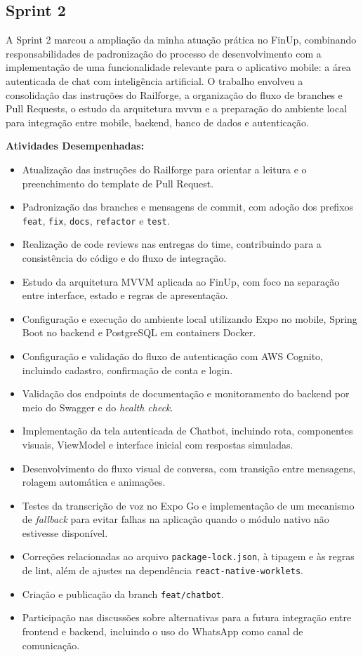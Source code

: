 \subsection{Sprint 2}

A Sprint 2 marcou a ampliação da minha atuação prática no FinUp, combinando
responsabilidades de padronização do processo de desenvolvimento com a
implementação de uma funcionalidade relevante para o aplicativo mobile: a área
autenticada de chat com inteligência artificial. O trabalho envolveu a
consolidação das instruções do Railforge, a organização do fluxo de branches e
Pull Requests, o estudo da arquitetura \ac{mvvm} e a preparação do ambiente local
para integração entre mobile, backend, banco de dados e autenticação.

\textbf{Atividades Desempenhadas:}

\begin{itemize}
\item
  Atualização das instruções do Railforge para orientar a leitura e o
  preenchimento do template de Pull Request.
\item
  Padronização das branches e mensagens de commit, com adoção dos prefixos
  \texttt{feat}, \texttt{fix}, \texttt{docs}, \texttt{refactor} e
  \texttt{test}.
\item
  Realização de code reviews nas entregas do time, contribuindo para a
  consistência do código e do fluxo de integração.
\item
  Estudo da arquitetura MVVM aplicada ao FinUp, com foco na separação entre
  interface, estado e regras de apresentação.
\item
  Configuração e execução do ambiente local utilizando Expo no mobile, Spring
  Boot no backend e PostgreSQL em containers Docker.
\item
  Configuração e validação do fluxo de autenticação com AWS Cognito, incluindo
  cadastro, confirmação de conta e login.
\item
  Validação dos endpoints de documentação e monitoramento do backend por meio
  do Swagger e do \textit{health check}.
\item
  Implementação da tela autenticada de Chatbot, incluindo rota, componentes
  visuais, ViewModel e interface inicial com respostas simuladas.
\item
  Desenvolvimento do fluxo visual de conversa, com transição entre mensagens,
  rolagem automática e animações.
\item
  Testes da transcrição de voz no Expo Go e implementação de um mecanismo de
  \textit{fallback} para evitar falhas na aplicação quando o módulo nativo não
  estivesse disponível.
\item
  Correções relacionadas ao arquivo \texttt{package-lock.json}, à tipagem e às
  regras de lint, além de ajustes na dependência
  \texttt{react-native-worklets}.
\item
  Criação e publicação da branch \texttt{feat/chatbot}.
\item
  Participação nas discussões sobre alternativas para a futura integração
  entre frontend e backend, incluindo o uso do WhatsApp como canal de
  comunicação.
\end{itemize}

